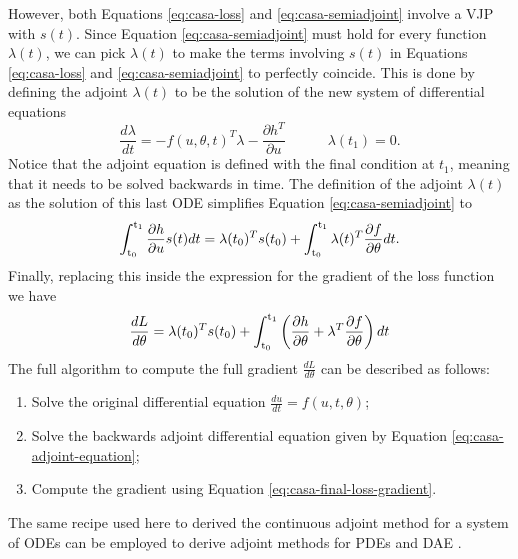 However, both Equations \eqref{eq:casa-loss} and \eqref{eq:casa-semiadjoint} involve a VJP with $s(t)$. 
Since Equation \eqref{eq:casa-semiadjoint} must hold for every function $\lambda(t)$, we can pick $\lambda(t)$ to make the terms involving $s(t)$ in Equations \eqref{eq:casa-loss} and \eqref{eq:casa-semiadjoint} to perfectly coincide. 
This is done by defining the adjoint $\lambda(t)$ to be the solution of the new system of differential equations
\begin{equation}
    \frac{d\lambda}{dt} 
    = 
    - 
    f(u, \theta, t)^T \lambda  
    - 
    \frac{\partial h^T}{\partial u} 
    \qquad \quad \lambda(t_1) = 0. 
    \label{eq:casa-adjoint-equation}
\end{equation}
Notice that the adjoint equation is defined with the final condition at $t_1$, meaning that it needs to be solved backwards in time. 
The definition of the adjoint $\lambda(t)$ as the solution of this last ODE simplifies Equation \eqref{eq:casa-semiadjoint} to
\begin{equation}
    \operatorname{\int_{t_0}^{t_1}} \frac{\partial h}{\partial u} s(t) dt
    = 
    \lambda(t_0)^T s(t_0)
    + 
    \operatorname{\int_{t_0}^{t_1}} \lambda(t)^T \frac{\partial f}{\partial \theta} dt.
\end{equation}
Finally, replacing this inside the expression for the gradient of the loss function we have 
\begin{equation}
    \frac{dL}{d\theta}
    = 
    \lambda(t_0)^T s(t_0)
    + 
    \operatorname{\int_{t_0}^{t_1}}
    \left( \frac{\partial h}{\partial \theta} + \lambda^T \frac{\partial f}{\partial \theta} \right) dt
    \label{eq:casa-final-loss-gradient}
\end{equation}
The full algorithm to compute the full gradient $\frac{dL}{d\theta}$ can be described as follows:
\begin{enumerate}
    \item Solve the original differential equation $\frac{du}{dt} = f(u, t, \theta)$;
    \item Solve the backwards adjoint differential equation given by Equation \eqref{eq:casa-adjoint-equation};
    \item Compute the gradient using Equation \eqref{eq:casa-final-loss-gradient}.
\end{enumerate}
The same recipe used here to derived the continuous adjoint method for a system of ODEs can be employed to derive adjoint methods for PDEs \cite{Giles_Pierce_2000} and DAE \cite{Cao_Li_Petzold_2002}. 


